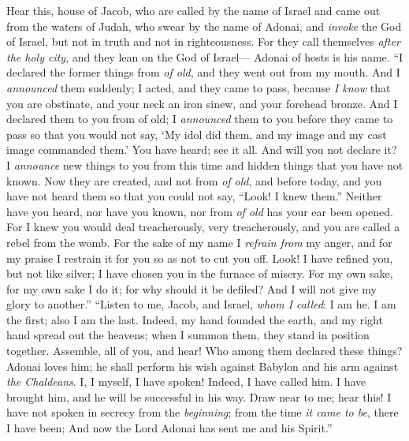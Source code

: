\begin{biblechapter} %
 Hear this, house of Jacob, 
who are called by the name of Israel 
and came out from the waters of Judah, 
who swear by the name of Adonai, 
and \textit{invoke} the God of Israel, 
but not in truth 
and not in righteousness.
\verse For they call themselves \textit{after the holy city}, 
and they lean on the God of Israel— 
Adonai of hosts is his name.
\verse “I declared the former things from \textit{of old}, 
and they went out from my mouth. 
And I \textit{announced} them suddenly; 
I acted, and they came to pass,
\verse because \textit{I know} that you are obstinate, 
and your neck an iron sinew, 
and your forehead bronze.
\verse And I declared them to you from of old; 
I \textit{ announced} them to you before they came to pass 
so that you would not say, ‘My idol did them, 
and my image and my cast image commanded them.’
\verse You have heard; see it all. 
And will you not declare it? 
I \textit{announce} new things to you from this time 
and hidden things that you have not known.
\verse Now they are created, and not from \textit{of old}, 
and before today, and you have not heard them 
so that you could not say, “Look! I knew them.”
\verse Neither have you heard, nor have you known, 
nor from \textit{of old} has your ear been opened. 
For I knew you would deal treacherously, very treacherously, 
and you are called a rebel from the womb.
\verse For the sake of my name I \textit{refrain from} my anger, 
and for my praise I restrain it for you 
so as not to cut you off.
\verse Look! I have refined you, but not like silver; 
I have chosen you in the furnace of misery.
\verse For my own sake, for my own sake I do it; 
for why should it be defiled? 
And I will not give my glory to another.”
 “Listen to me, Jacob, 
and Israel, \textit{whom I called}: 
I am he. I am the first; 
also I am the last.
\verse Indeed, my hand founded the earth, 
and my right hand spread out the heavens; 
when I summon them, they stand in position together.
\verse Assemble, all of you, and hear! 
Who among them declared these things? 
Adonai loves him; 
he shall perform his wish against Babylon 
and his arm against \textit{the Chaldeans}.
\verse I, I myself, I have spoken! 
Indeed, I have called him. 
I have brought him, 
and he will be successful in his way.
\verse Draw near to me; hear this! I have not spoken in secrecy from the \textit{beginning}; 
from the time \textit{it came to be}, there I have been; 
And now the Lord Adonai has sent me and his Spirit.”

\end{biblechapter}
